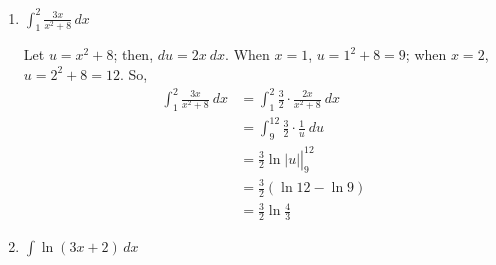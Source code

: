 \documentclass{article}
\begin{document}
\begin{enumerate}
\begin{enumerate}
        \begin{solution}
            We can rewrite this integral as 
            \[\int \frac{x+1}{x^2+1}\, dx = \int \frac{x}{x^2+1}\,dx + 
            \int \frac{1}{x^2+1}\,dx.\]
            The first integral can be done using the substitution $u=x^2+1$, 
            $du = 2x\,dx$. The second is an elementary antiderivative.
            \begin{align*}
            \int \frac{x+1}{x^2+1}\, dx &= \frac{1}{2}\int \frac{1}{u}\,du + 
            \int \frac{1}{x^2+1}\,dx \\
            &= \tfrac{1}{2}\ln|u| + \arctan(x) + C \\
            &= \tfrac{1}{2}\ln(x^2+1) + \arctan(x) +C.
            \end{align*}
        \end{solution}

        \item 
        \begin{problem}[\vfill]
            $\displaystyle\int_1^2 \frac{3x}{x^2+8}\, dx$
        \end{problem}

      \begin{solution} %
        Let $\displaystyle u = x^2 + 8$; then, $du = 2x~dx$.  When $x = 1$,
        $u = 1^2 + 8 = 9$; when $x = 2$, $u = 2^2 + 8 = 12$.  So, 
        \begin{align*}
          \int_1^2 \frac{3x}{x^2 + 8}~dx & =  
          \int_1^2 \frac{3}{2} \cdot \frac{2x}{x^2 + 8}~dx \\
          & = \int_9^{12} \frac{3}{2} \cdot \frac{1}{u}~du \\
          & = \left. \frac{3}{2} \ln |u| \right|_9^{12} \\
          & = \boxed{\frac{3}{2} (\ln 12 - \ln 9)} \\
          &= \frac{3}{2} \ln \frac{4}{3} 
        \end{align*}
      \end{solution}
    
    \item 
        \begin{problem}[\vfill]
            $\displaystyle \int \ln(3x+2)\, dx$
        \end{problem}
        

\end{enumerate}
\end{enumerate}
\end{document}
